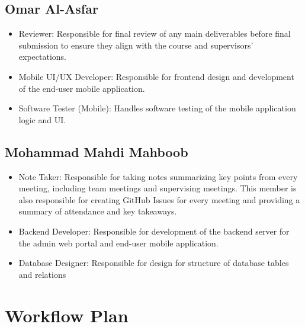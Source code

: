 \documentclass{article}
\begin{document}
\begin{flushleft}
\subsection{Omar Al-Asfar}
\begin{itemize}
  \item Reviewer: Responsible for final review of any main deliverables before final submission to ensure they align with the course and supervisors’ expectations.
  \item Mobile UI/UX Developer: Responsible for frontend design and development of the end-user mobile application.
  \item Software Tester (Mobile): Handles software testing of the mobile application logic and UI.
\end{itemize}

\subsection{Mohammad Mahdi Mahboob}
\begin{itemize}
  \item Note Taker: Responsible for taking notes summarizing key points from every meeting, including team meetings and supervising meetings. 
  This member is also responsible for creating GitHub Issues for every meeting and providing a summary of attendance and key takeaways.
  \item Backend Developer: Responsible for development of the backend server for the admin web portal and end-user mobile application.
  \item Database Designer: Responsible for design for structure of database tables and relations
\end{itemize}
\end{flushleft}

\section{Workflow Plan}
\end{document}
